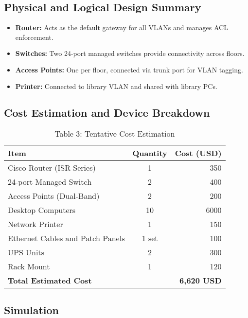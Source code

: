 \documentclass[11pt,a4paper]{article}
\begin{document}
\subsection{Physical and Logical Design Summary}

\begin{itemize}
    \item \textbf{Router:} Acts as the default gateway for all VLANs and manages ACL enforcement.
    \item \textbf{Switches:} Two 24-port managed switches provide connectivity across floors.
    \item \textbf{Access Points:} One per floor, connected via trunk port for VLAN tagging.
    \item \textbf{Printer:} Connected to library VLAN and shared with library PCs.
\end{itemize}

\subsection{Cost Estimation and Device Breakdown}

\begin{table}[!htbp]
\centering
\begin{tabular}{|l|c|r|}
\hline
\textbf{Item} & \textbf{Quantity} & \textbf{Cost (USD)} \\
\hline
Cisco Router (ISR Series) & 1 & 350 \\
24-port Managed Switch & 2 & 400 \\
Access Points (Dual-Band) & 2 & 200 \\
Desktop Computers & 10 & 6000 \\
Network Printer & 1 & 150 \\
Ethernet Cables and Patch Panels & 1 set & 100 \\
UPS Units & 2 & 300 \\
Rack Mount & 1 & 120 \\
\hline
\textbf{Total Estimated Cost} & & \textbf{6,620 USD} \\
\hline
\end{tabular}
\caption{Table 3: Tentative Cost Estimation}
\end{table}

\subsection{Simulation}
\end{document}
